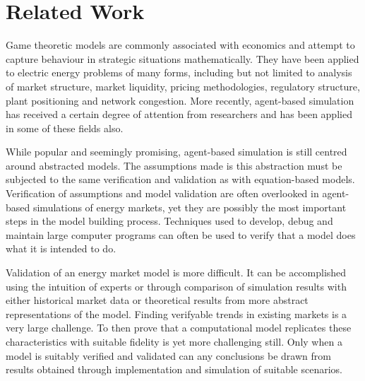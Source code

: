 \chapter{Related Work}
Game theoretic models are commonly associated with economics and attempt to
capture behaviour in strategic situations mathematically.  They have been
applied to electric energy problems of many forms, including but not limited
to analysis of market structure, market liquidity, pricing methodologies,
regulatory structure, plant positioning and network congestion.  More
recently, agent-based simulation has received a certain degree of attention
from researchers and has been applied in some of these fields also.

While popular and seemingly promising, agent-based simulation is still centred
around abstracted models.  The assumptions made is this abstraction must be
subjected to the same verification and validation as with equation-based
models.  Verification of assumptions and model validation are often overlooked
in agent-based simulations of energy markets, yet they are possibly the most
important steps in the model building process.  Techniques used to develop,
debug and maintain large computer programs can often be used to verify that a
model does what it is intended to do.

Validation of an energy market model is more difficult.  It can be accomplished
using the intuition of experts or through comparison of simulation results
with either historical market data or theoretical results from more abstract
representations of the model.  Finding verifyable trends in existing markets
is a very large challenge.  To then prove that a computational model
replicates these characteristics with suitable fidelity is yet more
challenging still.  Only when a model is suitably verified and validated can
any conclusions be drawn from results obtained through implementation and
simulation of suitable scenarios.